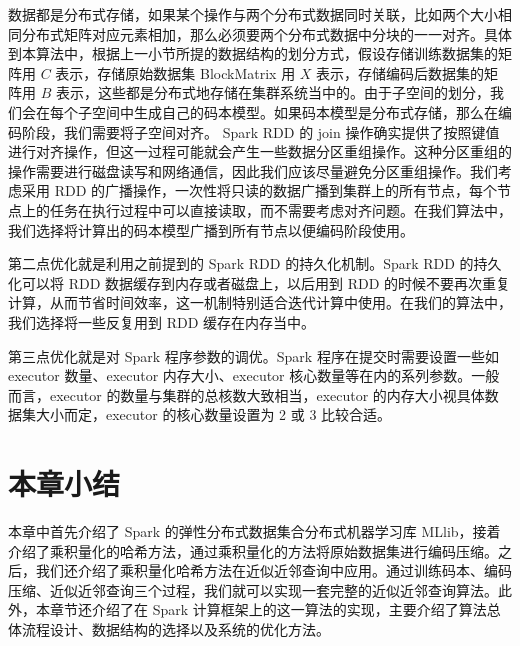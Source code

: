 数据都是分布式存储，如果某个操作与两个分布式数据同时关联，比如两个大小相同分布式矩阵对应元素相加，那么必须要两个分布式数据中分块的一一对齐。具体到本算法中，根据上一小节所提的数据结构的划分方式，假设存储训练数据集的矩阵用 $C$ 表示，存储原始数据集 BlockMatrix 用 $X$ 表示，存储编码后数据集的矩阵用 $B$ 表示，这些都是分布式地存储在集群系统当中的。由于子空间的划分，我们会在每个子空间中生成自己的码本模型。如果码本模型是分布式存储，那么在编码阶段，我们需要将子空间对齐。 Spark RDD 的 join 操作确实提供了按照键值进行对齐操作，但这一过程可能就会产生一些数据分区重组操作。这种分区重组的操作需要进行磁盘读写和网络通信，因此我们应该尽量避免分区重组操作。我们考虑采用 RDD 的广播操作，一次性将只读的数据广播到集群上的所有节点，每个节点上的任务在执行过程中可以直接读取，而不需要考虑对齐问题。在我们算法中，我们选择将计算出的码本模型广播到所有节点以便编码阶段使用。

第二点优化就是利用之前提到的 Spark RDD 的持久化机制。Spark RDD 的持久化可以将 RDD 数据缓存到内存或者磁盘上，以后用到 RDD 的时候不要再次重复计算，从而节省时间效率，这一机制特别适合迭代计算中使用。在我们的算法中，我们选择将一些反复用到 RDD 缓存在内存当中。

第三点优化就是对 Spark 程序参数的调优。Spark 程序在提交时需要设置一些如 executor 数量、executor 内存大小、executor 核心数量等在内的系列参数。一般而言，executor 的数量与集群的总核数大致相当，executor 的内存大小视具体数据集大小而定，executor 的核心数量设置为 2 或 3 比较合适。
\section{本章小结}
本章中首先介绍了 Spark 的弹性分布式数据集合分布式机器学习库 MLlib，接着介绍了乘积量化的哈希方法，通过乘积量化的方法将原始数据集进行编码压缩。之后，我们还介绍了乘积量化哈希方法在近似近邻查询中应用。通过训练码本、编码压缩、近似近邻查询三个过程，我们就可以实现一套完整的近似近邻查询算法。此外，本章节还介绍了在 Spark 计算框架上的这一算法的实现，主要介绍了算法总体流程设计、数据结构的选择以及系统的优化方法。


